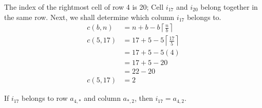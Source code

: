 \documentclass[letterpaper, twoside,12pt]{article}
\begin{document}
    The index of the rightmost cell of row 4 is 20; Cell $i_{17}$ and $i_{20}$ belong together in the same row. Next, we shall determine which column $i_{17}$ belongs to.
    \begin{equation*}
        \begin{split}
            c(b,n) &= n + b - b\left\lceil \frac{n}{b} \right\rceil \\
            c(5,17) &= 17 + 5 - 5\left\lceil \frac{17}{5} \right\rceil \\
                &= 17 + 5 - 5(4) \\
                &= 17 + 5 - 20 \\
                &= 22 - 20 \\
            c(5,17) &= 2
        \end{split}
    \end{equation*}

    \newpage

    If $i_{17}$ belongs to row $a_{4,*}$ and column $a_{*,2}$, then $i_{17} = a_{4,2}$.
\end{document}
